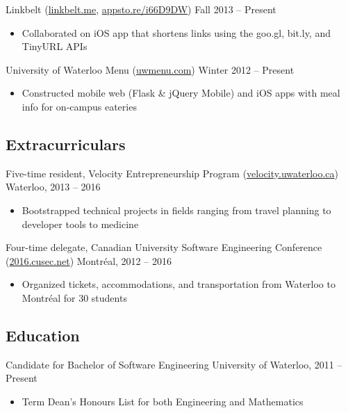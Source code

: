 \documentclass[pdftex,11pt,letterpaper]{article}
\begin{document}
Linkbelt (\href{http://linkbelt.me}{linkbelt.me}, \href{http://appsto.re/i66D9DW}{appsto.re/i66D9DW}) \hfill {\color{gray} Fall 2013 -- Present}
\begin{itemize}
  \item Collaborated on iOS app that shortens links using the goo.gl, bit.ly, and TinyURL APIs
\end{itemize}

University of Waterloo Menu (\href{http://uwmenu.com}{uwmenu.com}) \hfill {\color{gray} Winter 2012 -- Present}
\begin{itemize}
  \item Constructed mobile web (Flask \& jQuery Mobile) and iOS apps with meal info for on-campus eateries
\end{itemize}

\subsection*{Extracurriculars}

Five-time resident, Velocity Entrepreneurship Program (\href{http://velocity.uwaterloo.ca}{velocity.uwaterloo.ca}) \hfill {\color{gray} Waterloo, 2013 -- 2016}
\begin{itemize}
  \item Bootstrapped technical projects in fields ranging from travel planning to developer tools to medicine
\end{itemize}

Four-time delegate, Canadian University Software Engineering Conference (\href{http://2016.cusec.net}{2016.cusec.net}) \hfill {\color{gray} Montr\'{e}al, 2012 -- 2016}
\begin{itemize}
  \item Organized tickets, accommodations, and transportation from Waterloo to Montr\'{e}al for 30 students
\end{itemize}

\subsection*{Education}

Candidate for Bachelor of Software Engineering \hfill {\color{gray} University of Waterloo, 2011 -- Present}
\begin{itemize}
  \item Term Dean's Honours List for both Engineering and Mathematics
\end{itemize}
\end{document}

